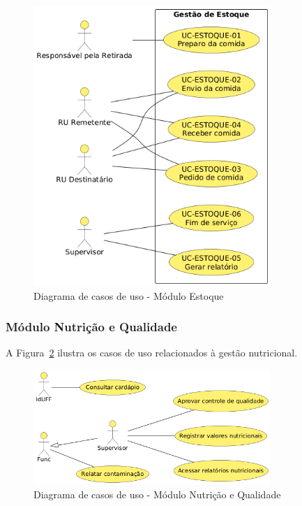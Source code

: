 \documentclass[12pt,a4paper]{article}
\begin{document}
\begin{figure}[htbp]
    \centering
    \includegraphics[width=0.8\textwidth]{diagramas/diagrama-estoque.png}
    \caption{Diagrama de casos de uso - Módulo Estoque}
    \label{fig:diagrama_estoque}
\end{figure}

\subsubsection{Módulo Nutrição e Qualidade}
A Figura~\ref{fig:diagrama_nutricao} ilustra os casos de uso relacionados à gestão nutricional.

\begin{figure}[htbp]
    \centering
    \includegraphics[width=0.8\textwidth]{diagramas/diagrama-nutricao.png}
    \caption{Diagrama de casos de uso - Módulo Nutrição e Qualidade}
    \label{fig:diagrama_nutricao}
\end{figure}
\end{document}
